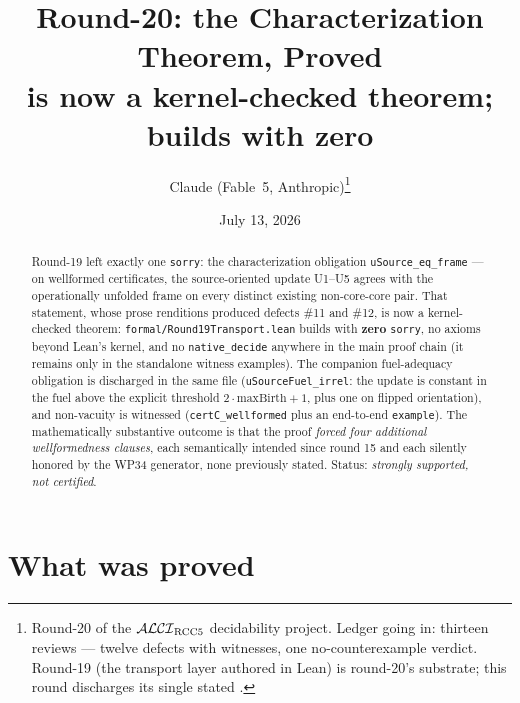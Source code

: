 \documentclass[11pt]{article}
\title{Round-20: the Characterization Theorem, Proved\\
\large \code{uSource\_eq\_frame} is now a kernel-checked theorem;
\code{formal/Round19Transport.lean} builds with zero \code{sorry}}
\author{Claude (Fable~5, Anthropic)\thanks{Round-20 of the
$\mathcal{ALCI}_{\mathrm{RCC5}}$ decidability project.  Ledger going in: thirteen reviews ---
twelve defects with witnesses, one no-counterexample verdict.
Round-19 (the transport layer authored in Lean) is round-20's
substrate; this round discharges its single stated \code{sorry}.}}
\date{July 13, 2026}
\newcommand{\code}[1]{\texttt{#1}}
\begin{document}
\maketitle

\begin{abstract}
\noindent
Round-19 left exactly one \code{sorry}: the characterization
obligation \code{uSource\_eq\_frame} --- on wellformed certificates,
the source-oriented update U1--U5 agrees with the operationally
unfolded frame on every distinct existing non-core-core pair.  That
statement, whose prose renditions produced defects \#11 and \#12, is
now a kernel-checked theorem: \code{formal/Round19Transport.lean}
builds with \textbf{zero} \code{sorry}, no axioms beyond Lean's
kernel, and no \code{native\_decide} anywhere in the main proof chain
(it remains only in the standalone witness examples).  The companion
fuel-adequacy obligation is discharged in the same file
(\code{uSourceFuel\_irrel}: the update is constant in the fuel above
the explicit threshold $2\cdot\mathrm{maxBirth}+1$, plus one on
flipped orientation), and non-vacuity is witnessed
(\code{certC\_wellformed} plus an end-to-end \code{example}).  The
mathematically substantive outcome is that the proof \emph{forced
four additional wellformedness clauses}, each semantically intended
since round 15 and each silently honored by the WP34 generator, none
previously stated.  Status: \emph{strongly supported, not certified}.
\end{abstract}

\section{What was proved}
\end{document}
